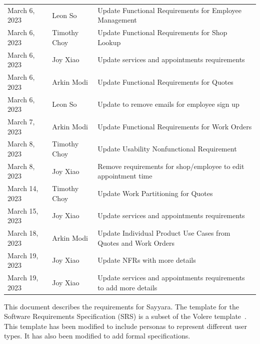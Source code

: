 \documentclass[12pt]{article}
\begin{document}
\begin{longtable}{p{} p{} p{}}
	March 6, 2023      & Leon So               & Update Functional Requirements for Employee Management                             \\
	March 6, 2023      & Timothy Choy          & Update Functional Requirements for Shop Lookup                                     \\
	March 6, 2023      & Joy Xiao              & Update services and appointments requirements                                      \\
	March 6, 2023      & Arkin Modi            & Update Functional Requirements for Quotes                                          \\
	March 6, 2023      & Leon So               & Update to remove emails for employee sign up                                       \\
	March 7, 2023      & Arkin Modi            & Update Functional Requirements for Work Orders                                     \\
	March 8, 2023      & Timothy Choy          & Update Usability Nonfunctional Requirement                                         \\
	March 8, 2023      & Joy Xiao              & Remove requirements for shop/employee to edit appointment time                     \\
	March 14, 2023     & Timothy Choy          & Update Work Partitioning for Quotes                                                \\
	March 15, 2023     & Joy Xiao              & Update services and appointments requirements                                      \\
	March 18, 2023     & Arkin Modi            & Update Individual Product Use Cases from Quotes and Work Orders                    \\
	March 19, 2023     & Joy Xiao              & Update NFRs with more details                                                      \\
	March 19, 2023     & Joy Xiao              & Update services and appointments requirements to add more details                  \\
	\bottomrule
\end{longtable}

\newpage


This document describes the requirements for Sayyara. The template for the Software Requirements
Specification (SRS) is a subset of the Volere template~\citep{RobertsonAndRobertson2012}. This
template has been modified to include personas to represent different user types. It has also been
modified to add formal specifications.
\end{document}
